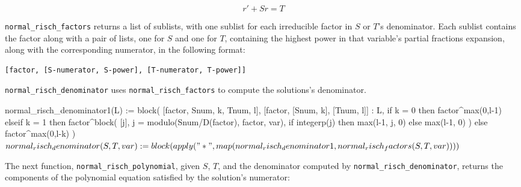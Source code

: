 $$r' + S r = T$$

{\tt normal_risch_factors} returns a list of sublists, with one
sublist for each irreducible factor in $S$ or $T$'s denominator.  Each
sublist contains the factor along with a pair of lists, one for $S$
and one for $T$, containing the highest power in that
variable's partial fractions expansion, along with the corresponding
numerator, in the following format:

\begin{center}
\begin{verbatim}
[factor, [S-numerator, S-power], [T-numerator, T-power]]
\end{verbatim}
\end{center}


{\tt normal_risch_denominator} uses {\tt normal_risch_factors}
to compute the solutions's denominator.

\begin{maximablock}
normal_risch_denominator1(L) := block(
   [factor, Snum, k, Tnum, l],
   [factor, [Snum, k], [Tnum, l]] : L,
   if k = 0 then factor^max(0,l-1)
   elseif k = 1 then factor^block(
      [j],
      j = modulo(Snum/D(factor), factor, var),
      if integerp(j) then max(l-1, j, 0)
                     else max(l-1, 0)
   )
   else factor^max(0,l-k)
)$

normal_risch_denominator(S, T, var) := block(
   apply("*",
      map(normal_risch_denominator1,
         normal_risch_factors(S, T, var)))
)$
\end{maximablock}

The next function, {\tt normal_risch_polynomial}, given $S$, $T$, and
the denominator computed by {\tt normal_risch_denominator},
returns the components of the polynomial equation
satisfied by the solution's numerator:

